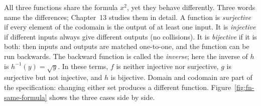 All three functions share the formula $x^2$, yet they behave differently. Three words name the differences; Chapter~13 studies them in detail. A function is \emph{surjective} if every element of the codomain is the output of at least one input. It is \emph{injective} if different inputs always give different outputs (no collisions). It is \emph{bijective} if it is both: then inputs and outputs are matched one-to-one, and the function can be run backwards. The backward function is called the \emph{inverse}; here the inverse of $h$ is $h^{-1}(y) = \sqrt{y}$. In these terms, $f$ is neither injective nor surjective, $g$ is surjective but not injective, and $h$ is bijective. Domain and codomain are part of the specification: changing either set produces a different function. Figure~\ref{fig:fn-same-formula} shows the three cases side by side.

